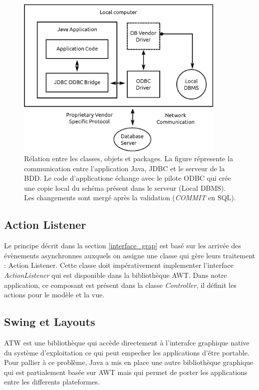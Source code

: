 \documentclass[10pt]{article}
\begin{document}
\begin{figure}[ht]
    \centering
    \includegraphics[width=10cm]{pics/jdbc.eps}
    \caption{Rélation entre les classes, objets et packages. \cite{TutorialsPoint} La figure répresente la communication entre l'application Java, JDBC et le serveur de la BDD. Le code d'applicatione échange avec le pilote ODBC qui crée une copie local du schéma présent dans le serveur (Local DBMS). Les changements sont mergé après la validation (\textit{COMMIT} en SQL).}
    \label{fig:jdbc}
\end{figure}

\subsection{Action Listener}
Le principe décrit dans la section \ref{interface_grap} est basé sur les arrivée des évènements asynchronnes auxquels on assigne une classe qui gère leurs traitement : Action Listener. Cette classe doit impérativement implementer l'interface \textit{ActionListener} qui est disponible dans la bibliothèque AWT. Dans notre application, ce composant est présent dans la classe \textit{Controller}, il définit les actions pour le modèle et la vue. 

\subsection{Swing et Layouts}
ATW est une bibliothèque qui accède directement à l'interafce graphique native du système d'exploitation ce qui peut empecher les applications d'être portable. Pour pallier à ce problème, Java a mis en place une autre bibliothèque graphique qui est partialement basée sur AWT mais qui permet de porter les applications entre les differents plateformes. 
\end{document}

